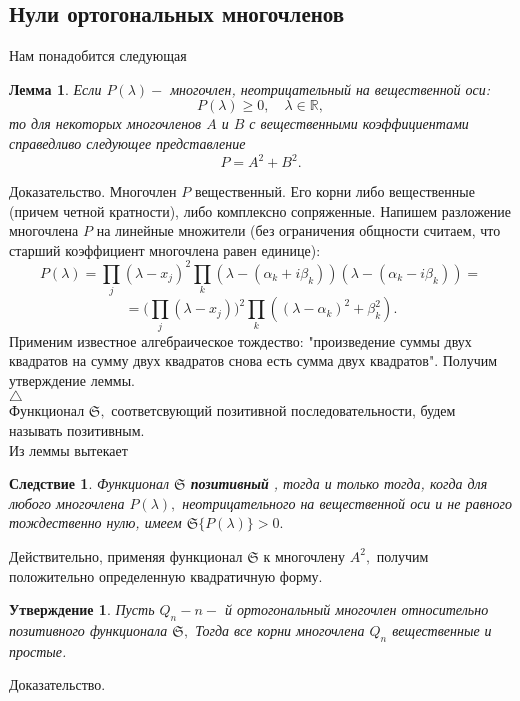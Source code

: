 \documentclass[12 pt, a4 paper]{article}
\theoremstyle{plain}   \newtheorem{Pro}{Задача}
\newtheorem{Sta}{Утверждение}
\newtheorem{Cor}{Следствие}
\newtheorem{Lem}{Лемма}
\begin{document}
\subsection{Нули ортогональных многочленов}
$ \; $
\\

Нам понадобится следующая
\begin{Lem}
Если
$ P( \lambda ) - $
многочлен, неотрицательный на вещественной оси:
$$
  P( \lambda ) \geq 0, \quad \lambda \in \mathbb{R},
$$
то для некоторых многочленов
$ A $ и $ B $
с вещественными коэффициентами справедливо следующее представление
$$
  P=A^2 +B^2 .
$$
\end{Lem}
{\Large Доказательство.}
Многочлен
$ P $
вещественный. Его корни либо вещественные
(причем четной кратности), либо комплексно сопряженные.
Напишем разложение многочлена
$ P $
на линейные множители (без ограничения общности считаем, что
старший коэффициент многочлена равен единице):
$$
  P(\lambda )=\prod _j (\lambda -x_j )^2
  \prod _k (\lambda -(\alpha _k +i \beta _k ))
  (\lambda -(\alpha _k -i\beta _k ))=
$$
$$
  =\biggl ( \prod _j (\lambda -x_j ) \biggr )^2
  \prod _k ( ( \lambda -\alpha _k )^2 + \beta _k ^2 ).
$$
Применим известное алгебраическое тождество: "произведение
суммы двух квадратов на сумму двух квадратов снова есть
сумма двух квадратов". Получим утверждение леммы.\\
$ \triangle $
\\
Функционал
$ \mathfrak{S} , $
соответсвующий позитивной последовательности, будем называть
позитивным.\\
Из леммы вытекает
\begin{Cor}
Функционал
$ \mathfrak{S} $
{\bfseries позитивный}
, тогда и только тогда,
когда для любого многочлена
$ P( \lambda ) , $
неотрицательного на вещественной оси и не равного тождественно нулю,
имеем
$ \mathfrak{S} \{ P( \lambda ) \} >0. $
\end{Cor}
Действительно, применяя функционал
$ \mathfrak{S} $
к многочлену
$ A^2 , $
получим положительно определенную квадратичную форму.
\begin{Sta}
Пусть
$ Q_n - n- $
й ортогональный многочлен относительно позитивного функционала
$ \mathfrak{S} , $
Тогда все корни многочлена
$ Q_n $
вещественные и простые.
\end{Sta}
{\Large Доказательство.}
\end{document}
